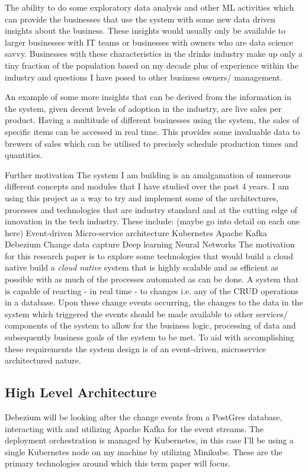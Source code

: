 \begin{flushleft}
	The ability to do some exploratory data analysis and other ML activities which can provide the businesses that use the system with some new data driven insights about the business. These insights would usually only be available to larger businesses with IT teams or businesses with owners who are data science savvy. Businesses with these characteristics in the drinks industry make up only a tiny fraction of the population based on my decade plus of experience within the industry and questions I have posed to other business owners/ management.

	An example of some more insights that can be derived from the information in the system, given decent levels of adoption in the industry, are live sales per product. Having a multitude of different businesses using the system, the sales of specific items can be accessed in real time. This provides some invaluable data to brewers of sales which can be utilised to precisely schedule production times and quantities.

	Further motivation
	The system I am building is an amalgamation of numerous different concepts and modules that I have studied over the past 4 years. I am using this project as a way to try and implement some of the architectures, processes and technologies that are industry standard and at the cutting edge of innovation in the tech industry. These include: (maybe go into detail on each one here)
	Event-driven Micro-service architecture
	Kubernetes
	Apache Kafka
	Debezium Change data capture
	Deep learning Neural Networks
	\bigbreak
	The motivation for this research paper is to explore some technologies that would build a cloud native build a \emph{cloud native} system that
	is highly scalable and as efficient as possible with as much of the processes automated as can be done.\newline
	A system that is capable of reacting - in real time - to changes i.e. any of the CRUD operations in a database. \newline
	Upon these change events occurring, the changes to the data in the system which triggered the events should be made
	available to other services/ components of the system to allow for the business logic, processing of data and subsequently
	business goals of the system to be met.
	To aid with accomplishing these requirements the system design is of an event-driven, microservice architectured nature.
	\newline
	\subsection{High Level Architecture}
	Debezium will be looking after the change events from a PostGres database, interacting with and utilizing Apache Kafka \autocite{ApacheKafka} for the event streams.
	The deployment orchestration is managed by Kubernetes, in this case I'll be using a single Kubernetes node on my machine by utilizing Minikube\autocite{MinikubeStart}.
	These are the primary technologies around which this term paper will focus.


\end{flushleft}

